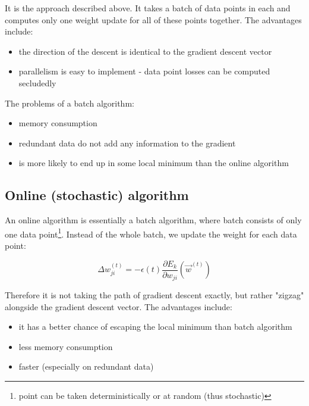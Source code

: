 It is the approach described above. It takes a batch of data points in each and computes only one weight update for all of these points together. The advantages include:

\begin{itemize}

\item the direction of the descent is identical to the gradient descent vector
\item parallelism is easy to implement - data point losses can be computed secludedly

\end{itemize}

\noindent
The problems of a batch algorithm:

\begin{itemize}

\item memory consumption
\item redundant data do not add any information to the gradient
\item is more likely to end up in some local minimum than the online algorithm

\end{itemize}

\subsection*{Online (stochastic) algorithm}

An online algorithm is essentially a batch algorithm, where batch consists of only one data point\footnote{point can be taken deterministically or at random (thus stochastic)}. Instead of the whole batch, we update the weight for each data point:

$$ \Delta w_{ji}^{(t)} = - \epsilon(t) \frac{\partial E_k}{\partial w_{ji}}(\overrightarrow{w}^{(t)}) $$

\noindent
Therefore it is not taking the path of gradient descent exactly, but rather "zigzag" alongside the gradient descent vector. The advantages include:

\begin{itemize}

\item it has a better chance of escaping the local minimum than batch algorithm
\item less memory consumption
\item faster (especially on redundant data)

\end{itemize}


